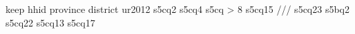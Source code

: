 keep hhid province district ur2012 s5cq2 s5cq4 s5cq
> 8 s5cq15 ///
        s5cq23 s5bq2 s5cq22 s5cq13 s5cq17 
